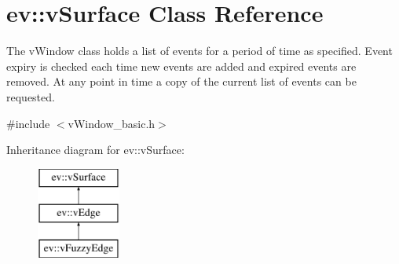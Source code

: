 \hypertarget{classev_1_1vSurface}{}\section{ev\+:\+:v\+Surface Class Reference}
\label{classev_1_1vSurface}


The v\+Window class holds a list of events for a period of time as specified. Event expiry is checked each time new events are added and expired events are removed. At any point in time a copy of the current list of events can be requested.  




{\ttfamily \#include $<$v\+Window\+\_\+basic.\+h$>$}

Inheritance diagram for ev\+:\+:v\+Surface\+:\begin{figure}[H]
\begin{center}
\leavevmode
\includegraphics[height=3.000000cm]{classev_1_1vSurface}
\end{center}
\end{figure}
